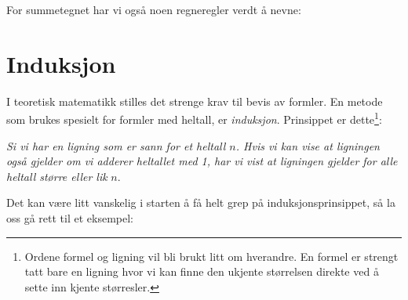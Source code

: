 For summetegnet har vi også noen regneregler verdt å nevne:\regv
{}
\newpage
{}
\newpage
\section{Induksjon} 
I teoretisk matematikk stilles det strenge krav til bevis av formler. En metode som brukes spesielt for formler med heltall, er \textit{induksjon}. Prinsippet er dette\footnote{Ordene formel og ligning vil bli brukt litt om hverandre. En formel er strengt tatt bare en ligning hvor vi kan finne den ukjente størrelsen direkte ved å sette inn kjente størresler.}:\vsk

\textsl{Si vi har en ligning som er sann for et heltall $ n $. Hvis vi kan vise at ligningen også gjelder om vi adderer heltallet med 1, har vi vist at ligningen gjelder for alle heltall større eller lik} $ n $.\vsk

Det kan være litt vanskelig i starten å få helt grep på induksjonsprinsippet, så la oss gå rett til et eksempel:\vsk

